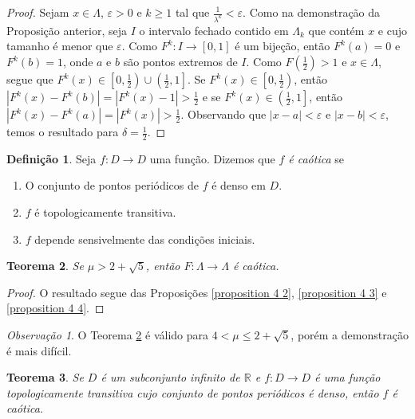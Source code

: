 \documentclass[a4paper, 12pt]{article}
\theoremstyle{definition}
\newtheorem{definition}{Definição}[section]
\theoremstyle{plain}
\theoremstyle{plain}
\theoremstyle{plain}
\newtheorem{theorem}[definition]{Teorema}
\theoremstyle{definition}
\theoremstyle{remark}
\newtheorem*{remark}{Observação}
\newcommand{\RR}{\mathbb{R}}
\begin{document}
\begin{proof}
Sejam $x \in \Lambda$, $\varepsilon > 0$ e $k \geq 1$ tal que $\frac{1}{\lambda^k} < \varepsilon$. Como na demonstração da Proposição anterior, seja $I$ o intervalo fechado contido em $\Lambda_k$ que contém $x$ e cujo tamanho é menor que $\varepsilon$. Como $F^k: I \to [0, 1]$ é um bijeção, então $F^k(a) = 0$ e  $F^k(b) = 1$, onde $a$ e $b$ são pontos extremos de $I$. Como $F(\frac{1}{2}) > 1$ e $x \in \Lambda$, segue que $F^{k}(x) \in \left[0, \frac{1}{2}\right) \cup \left(\frac{1}{2}, 1\right]$. Se $F^{k}(x) \in \left[0, \frac{1}{2}\right)$, então $|F^k(x) - F^k(b)| = |F^k(x) - 1| > \frac{1}{2}$ e se $F^{k}(x) \in \left(\frac{1}{2}, 1\right]$, então $|F^k(x) - F^k(a)| = |F^k(x)| > \frac{1}{2}$. Observando que $|x - a| < \varepsilon$ e  $|x - b| < \varepsilon$, temos o resultado para $\delta = \frac{1}{2}$. 
\end{proof}

\begin{definition}
Seja $f: D \to D$ uma função. Dizemos que \textit{$f$ é caótica} se
\begin{enumerate}
\item O conjunto de pontos periódicos de $f$ é denso em $D$.
\item $f$ é topologicamente transitiva.
\item $f$ depende sensivelmente das condições iniciais.
\end{enumerate}
\end{definition}

\begin{theorem}
\label{theorem 4 2}
Se $\mu > 2 + \sqrt{5}$, então $F: \Lambda \to \Lambda$ é caótica.
\end{theorem}

\begin{proof}
O resultado segue das Proposições \ref{proposition 4 2}, \ref{proposition 4 3} e \ref{proposition 4 4}.
\end{proof}

\begin{remark}
O Teorema \ref{theorem 4 2} é válido para $4 < \mu \leq 2 + \sqrt{5}$, porém a demonstração é mais difícil.
\end{remark}

\begin{theorem}
\label{theorem 4 3}
Se $D$ é um subconjunto infinito de $\RR$ e $f: D \to D$ é uma função topologicamente transitiva cujo conjunto de pontos periódicos é denso, então $f$ é caótica.
\end{theorem}
\end{document}

